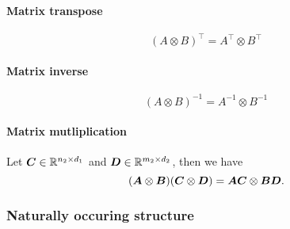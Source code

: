\paragraph{Matrix transpose}
$$ (A \otimes B)^{\top} = A^{\top} \otimes B^{\top} $$

\paragraph{Matrix inverse}
$$ (A \otimes B)^{-1} = A^{-1} \otimes B^{-1} $$

\paragraph{Matrix mutliplication}
Let ${\bm{C}} \in \mathbb{R}^{n_2 \times d_1}$ and ${\bm{D}} \in \mathbb{R}^{m_2 \times d_2}$, then we have
$$ ({\bm{A}} \otimes {\bm{B}})({\bm{C}} \otimes {\bm{D}}) = {\bm{A}} {\bm{C}} \otimes {\bm{B}} {\bm{D}}. $$

\subsubsection{Naturally occuring structure}

